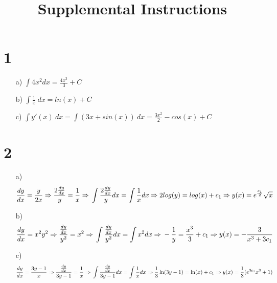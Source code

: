 \documentclass{article}
\title{Supplemental Instructions}
\date{
     }
\begin{document}
\maketitle


\section*{1}
\begin{itemize}
	\item[a) ] $\int 4x^2 dx = \frac{ 4x^3 }{ 3 } + C$
	\item[b) ] $\int \frac{1}{x} \> dx = ln(x) + C$
	\item[c) ] $\int y'(x) \> dx = \int( 3x + sin(x)) \> dx = 
				\frac{3x^2}{2} - cos(x) + C$
\end{itemize}


\section*{2}
\begin{itemize}
    \item[a)] $$\frac{dy}{dx} = \frac{y}{2x} \Rightarrow \\
                \frac{2 \frac{dy}{dx}}{y} = \frac{1}{x} \Rightarrow \\
                \int \frac{2 \frac{dy}{dx}}{y} dx= \int \frac{1}{x} dx \Rightarrow \\
                2 log(y) = log(x) +c_1 \Rightarrow \\
                y(x) = e^{\frac{c_1}{2}} \sqrt{x}$$

    \item[b)] $$\frac{dy}{dx} = x^2 y^2 \Rightarrow \\
                \frac{\frac{dy}{dx}}{y^2} = x^2 \Rightarrow \\
                \int \frac{\frac{dy}{dx}}{y^2} dx = \int x^2 dx \Rightarrow \\
                - \frac{1}{y} = \frac{x^3}{3} + c_1 \Rightarrow \\
                y(x) = - \frac{3}{x^3 + 3 c_1}$$

    \item[c)] $$\frac{dy}{dx} = \frac{3y - 1}{x} \Rightarrow \\
                \frac{\frac{dy}{dx}}{3y-1} = \frac{1}{x} \Rightarrow \\
                \int \frac{\frac{dy}{dx}}{3y-1} dx = \int \frac{1}{x} dx \Rightarrow \\
                \frac{1}{3} \ln(3y-1) = \ln(x) + c_1 \Rightarrow \\ 
                y(x) = \frac{1}{3}(e^{3 c_1} x^3 + 1)$$
\end{itemize}
\end{document}
